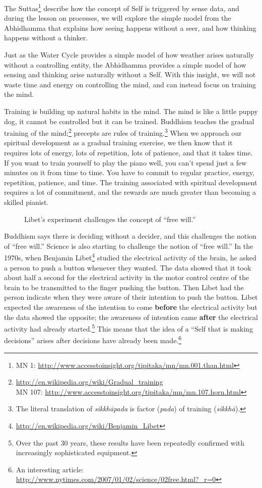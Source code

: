The Suttas\footnote{MN 1: \url{http://www.accesstoinsight.org/tipitaka/mn/mn.001.than.html}} describe how the concept of Self is triggered by sense data, and during the lesson on processes, we will explore the simple model from the Abhidhamma that explains how seeing happens without a seer, and how thinking happens without a thinker.

Just as the Water Cycle provides a simple model of how weather arises naturally without a controlling entity, the Abhidhamma provides a simple model of how sensing and thinking arise naturally without a Self. With this insight, we will not waste time and energy on controlling the mind, and can instead focus on training the mind.

Training is building up natural habits in the mind. The mind is like a little puppy dog, it cannot be controlled but it can be trained. Buddhism teaches the gradual training of the mind;\footnote{\url{http://en.wikipedia.org/wiki/Gradual_training}\\MN 107: \url{http://www.accesstoinsight.org/tipitaka/mn/mn.107.horn.html}} precepts are rules of training.\footnote{The literal translation of \textit{sikkhāpada} is factor (\textit{pada}) of training (\textit{sikkhā}).} When we approach our spiritual development as a gradual training exercise, we then know that it requires lots of energy, lots of repetition, lots of patience, and that it takes time. If you want to train yourself to play the piano well, you can’t spend just a few minutes on it from time to time. You have to commit to regular practice, energy, repetition, patience, and time. The training associated with spiritual development requires a lot of commitment, and the rewards are much greater than becoming a skilled pianist.

\begin{figure}[H]
\centering

\caption{Libet’s experiment challenges the concept of “free will.”}
\label{fig:Libet}
\end{figure}

Buddhism says there is deciding without a decider, and this challenges the notion of “free will.” Science is also starting to challenge the notion of “free will.” In the 1970s, when Benjamin Libet\footnote{\url{http://en.wikipedia.org/wiki/Benjamin_Libet}} studied the electrical activity of the brain, he asked a person to push a button whenever they wanted. The data showed that it took about half a second for the electrical activity in the motor control centre of the brain to be transmitted to the finger pushing the button. Then Libet had the person indicate when they were aware of their intention to push the button. Libet expected the awareness of the intention to come \textbf{before} the electrical activity but the data showed the opposite; the awareness of intention came \textbf{after} the electrical activity had already started.\footnote{Over the past 30 years, these results have been repeatedly confirmed with increasingly sophisticated equipment.} This means that the idea of a “Self that is making decisions” arises after decisions have already been made.\footnote{An interesting article: \url{http://www.nytimes.com/2007/01/02/science/02free.html?_r=0}}

